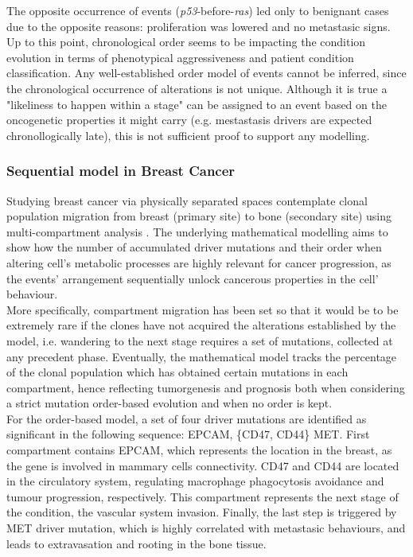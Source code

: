 The opposite occurrence of events (\textit{p53}-before-\textit{ras}) led only to benignant cases due to the opposite reasons: proliferation was lowered and no metastasic signs.
\\

Up to this point, chronological order seems to be impacting the condition evolution in terms of phenotypical aggressiveness and patient condition classification. Any well-established order model of events cannot be inferred, since the chronological occurrence of alterations is not unique. Although it is true a "likeliness to happen within a stage" can be assigned to an event based on the oncogenetic properties it might carry (e.g. mestastasis drivers are expected chronollogically late), this is not sufficient proof to support any modelling.

\subsubsection{Sequential model in Breast Cancer}
Studying breast cancer via physically separated spaces contemplate clonal population migration from breast (primary site) to bone (secondary site) using multi-compartment analysis \cite{Ascolani2019ModelingMatter}. The underlying mathematical modelling aims to show how the number of accumulated driver mutations and their order when altering cell’s metabolic processes are highly relevant for cancer progression, as the events' arrangement sequentially unlock cancerous properties in the cell' behaviour. 
\\

More specifically, compartment migration has been set so that it would be to be extremely rare if the clones have not acquired the alterations established by the model, i.e. wandering to the next stage requires a set of mutations, collected at any precedent phase. Eventually, the mathematical model tracks the percentage of the clonal population which has obtained certain mutations in each compartment, hence
reflecting tumorgenesis and prognosis both when considering a strict mutation order-based evolution and when no order is kept.
\\

For the order-based model, a set of four driver mutations are identified as significant in the following sequence: EPCAM, \{CD47, CD44\} MET. First compartment contains EPCAM, which represents the location in the breast, as the gene is involved in mammary cells connectivity. CD47 and CD44 are located in the circulatory system, regulating macrophage phagocytosis avoidance and tumour progression, respectively. This compartment represents the next stage of the condition, the vascular system invasion. Finally, the last step is triggered by MET driver mutation, which is highly correlated with metastasic behaviours, and leads to extravasation and rooting in the bone tissue.
\\

